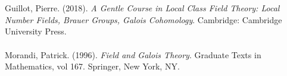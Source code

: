 \documentclass{article}
\begin{document}
 \\\\
\noindent Guillot, Pierre. (2018). \emph{A Gentle Course in Local Class Field Theory: Local Number Fields, Brauer Groups, Galois Cohomology}. Cambridge: Cambridge University Press. \\\\
\noindent Morandi, Patrick. (1996). \emph{Field and Galois Theory}. Graduate Texts in Mathematics, vol 167. Springer, New York, NY. \\\\
\end{document}
